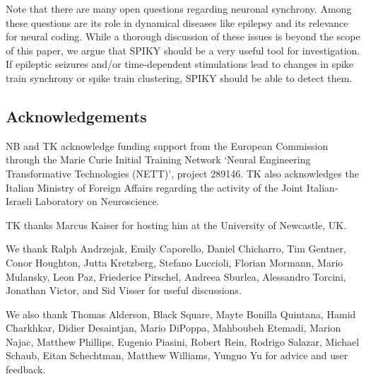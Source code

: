\documentclass[10pt,twocolumn]{elsart5p}
\begin{document}
Note that there are many open questions regarding neuronal synchrony. Among these questions are its role in dynamical diseases like epilepsy and its relevance for neural coding. While a thorough discussion of these issues is beyond the scope of this paper, we argue that SPIKY should be a very useful tool for investigation. If epileptic seizures and/or time-dependent stimulations lead to changes in spike train synchrony or spike train clustering, SPIKY should be able to detect them.

\vspace{1cm}

\begin{thanks}
\section{\label{s:Acknowledgement} \textbf{Acknowledgements}}

NB and TK acknowledge funding support from the European Commission through the Marie Curie Initial Training 	Network `Neural Engineering Transformative Technologies (NETT)', project 289146. TK also acknowledges the Italian Ministry of Foreign Affairs regarding the activity of the Joint Italian-Israeli Laboratory on Neuroscience.

TK thanks Marcus Kaiser for hosting him at the University of Newcastle, UK.
     
We thank Ralph Andrzejak, Emily Caporello, Daniel Chicharro, Tim Gentner, Conor Houghton, Jutta Kretzberg, Stefano Luccioli, Florian Mormann, Mario Mulansky, Leon Paz, Friederice Pirschel, Andreea Sburlea, Alessandro Torcini, Jonathan Victor, and Sid Visser for useful discussions.

We also thank Thomas Alderson, Black Square, Mayte Bonilla Quintana, Hamid Charkhkar, Didier Desaintjan, Mario DiPoppa, Mahboubeh Etemadi, Marion Najac, Matthew Phillips, Eugenio Piasini, Robert Rein, Rodrigo Salazar, Michael Schaub, Eitan Schechtman, Matthew Williams, Yunguo Yu for advice and user feedback.


\end{thanks}
\end{document}

